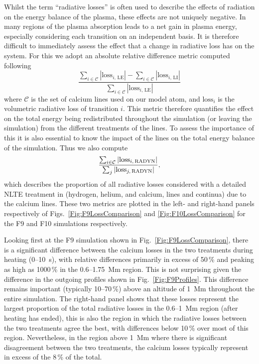 Whilst the term ``radiative losses'' is often used to describe the effects of radiation on the energy balance of the plasma, these effects are not uniquely negative.
In many regions of the plasma absorption leads to a net gain in plasma energy, especially considering each transition on an independent basis.
It is therefore difficult to immediately assess the effect that a change in radiative loss has on the system.
For this we adopt an absolute relative difference metric computed following
\begin{equation}
    \frac{\sum_{i\in\mathcal{C}}|\mathrm{loss}_{i,\,\mathrm{LE}}| - \sum_{i\in\mathcal{C}}|\mathrm{loss}_{i,\,\mathrm{LI}}|}{\sum_{i\in\mathcal{C}}|\mathrm{loss}_{i,\,\mathrm{LE}}|}
\end{equation}
where $\mathcal{C}$ is the set of calcium lines used on our model atom, and $\mathrm{loss}_i$ is the volumetric radiative loss of transition $i$.
This metric therefore quantifies the effect on the total energy being redistributed throughout the simulation (or leaving the simulation) from the different treatments of the \Caii{} lines.
To assess the importance of this it is also essential to know the impact of the \Caii{} lines on the total energy balance of the simulation.
Thus we also compute
\begin{equation}
    \frac{\sum_{i\in\mathcal{C}}|\mathrm{loss}_{i,\,\mathrm{RADYN{}}}|}{\sum_j|\mathrm{loss}_{j,\,\mathrm{RADYN{}}}|},
\end{equation}
which describes the proportion of all radiative losses considered with a detailed NLTE treatment in \Radyn{} (hydrogen, helium, and calcium, lines and continua) due to the calcium lines.
These two metrics are plotted in the left- and right-hand panels respectively of Figs.~\ref{Fig:F9LossComparison} and \ref{Fig:F10LossComparison} for the F9 and F10 simulations respectively.

Looking first at the F9 simulation shown in Fig.~\ref{Fig:F9LossComparison}, there is a significant difference between the calcium losses in the two treatments during heating (0--\SI{10}{\second}), with relative differences primarily in excess of 50\,\% and peaking as high as 1000\,\% in the 0.6--\SI{1.75}{\mega\m} region.
This is not surprising given the difference in the outgoing profiles shown in Fig.~\ref{Fig:F9Profiles}.
This difference remains important (typically 10--70\,\%) above an altitude of \SI{1}{\mega\metre} throughout the entire simulation.
The right-hand panel shows that these losses represent the largest proportion of the total radiative losses in the 0.6--\SI{1}{\mega\metre} region (after heating has ended), this is also the region in which the radiative losses between the two treatments agree the best, with differences below 10\,\% over most of this region.
Nevertheless, in the region above \SI{1}{\mega\metre} where there is significant disagreement between the two treatments, the calcium losses typically represent in excess of the 8\,\% of the total.

